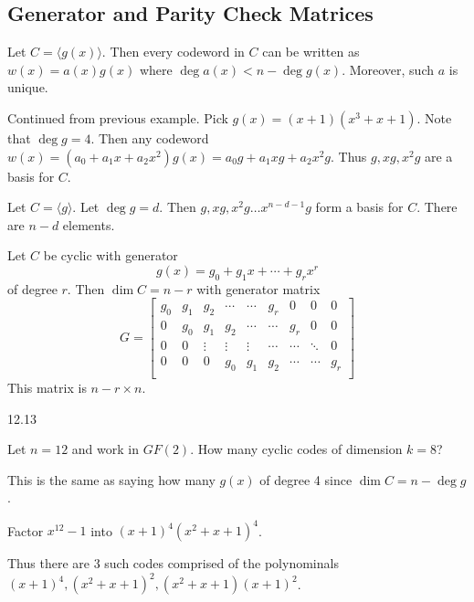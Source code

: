 \documentclass{article}
\begin{document}
\subsection{Generator and Parity Check Matrices}
\begin{theorem}
  Let \( C = \langle g(x) \rangle\).
  Then every codeword in \( C \) can be written as \( w(x) = a(x)g(x) \) where \( \deg a(x) < n - \deg g(x) \). Moreover, such \( a  \) is unique.
\end{theorem}
\begin{example}
  Continued from previous example. Pick \( g(x) = (x+1)(x^3+x+1) \). Note that \( \deg g = 4 \). Then any codeword \( w(x) = (a_0 + a_1x + a_2x^2)g(x) = a_0g + a_1xg + a_2x^2g \). Thus \( g, xg, x^2g \) are a basis for \( C \).
\end{example}
\begin{theorem}
  Let \( C = \langle g \rangle \). Let \( \deg g = d \).  Then \( g, xg, x^2g \dots x^{n-d-1}g  \) form a basis for \( C  \). There are \( n-d  \) elements.
\end{theorem}
\begin{theorem}\label{foo}
  Let \( C  \) be cyclic with generator \[
    g(x) = g_0 + g_1x + \cdots  + g_rx^r
  \] of degree \( r  \). Then \( \dim C = n-r \) with generator matrix \[
    G =
    \begin{bmatrix}
      g_0 & g_1 & g_2    & \cdots & \cdots & g_r    & 0      & 0      & 0   \\
      0   & g_0 & g_1    & g_2    & \cdots & \cdots & g_r    & 0      & 0   \\
      0   & 0   & \vdots & \vdots & \vdots & \cdots & \cdots & \ddots & 0   \\
      0   & 0   & 0      & g_0    & g_1    & g_2    & \cdots & \cdots & g_r \\
    \end{bmatrix}
  \]
  This matrix is \( n-r\times n \).
\end{theorem}
\begin{example}
  12.13
\end{example}
\begin{example}
  Let \( n=12 \) and work in \( GF(2) \). How many cyclic codes of dimension \( k=8 \)?

  This is the same as saying how many \( g(x) \) of degree 4 since \( \dim C = n - \deg g \).

  Factor \( x^{12} - 1 \) into \( (x+1)^4(x^2+x+1)^4 \).

  Thus there are 3 such codes comprised of the polynominals \( (x+1)^4, (x^2+x+1)^2, (x^2+x+1)(x+1)^2 \).
\end{example}
\end{document}
